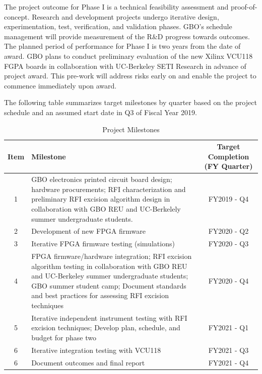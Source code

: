 \documentclass[10pt]{myNSF}
\begin{document}
The project outcome for Phase {\sc I} is a technical feasibility
assessment and proof-of-concept. Research and development projects
undergo iterative design, experimentation, test, verification, and
validation phases. GBO's schedule management will provide measurement
of the R\&D progress towards outcomes. The planned period of
performance for Phase {\sc I} is two years from the date of award. GBO
plans to conduct preliminary evaluation of the new Xilinx VCU118 FGPA
boards in collaboration with UC-Berkeley SETI Research in advance of
project award. This pre-work will address risks early on and enable
the project to commence immediately upon award.

The following table summarizes target milestones by quarter based on
the project schedule and an assumed start date in Q3 of Fiscal Year
2019.

\begin{table}[t]
  \centering
  \caption{Project Milestones \label{table:milestones}}
  \begin{tabular}{|c|p{3.75in}|c|}
    \hline
    Item & Milestone & Target Completion (FY Quarter) \\
    \hline
    1 & GBO electronics printed circuit board design; hardware procurements; RFI characterization and preliminary RFI excision algorithm design in collaboration with GBO REU and UC-Berkelely summer undergraduate students. & FY2019 - Q4 \\
    \hline
    2 & Development of new FPGA firmware & FY2020 - Q2 \\
    \hline
    3 & Iterative FPGA firmware testing (simulations) & FY2020 - Q3 \\
    \hline
    4 & FPGA firmware/hardware integration; RFI excision algorithm testing in collaboration with GBO REU and UC-Berkeley summer undergraduate students; GBO summer student camp; Document standards and best practices for assessing RFI excision techniques & FY2020 - Q4 \\
    \hline
    5 & Iterative independent instrument testing with RFI excision techniques; Develop plan, schedule, and budget for phase two & FY2021 - Q1 \\
    \hline
    6 & Iterative integration testing with VCU118 & FY2021 - Q3 \\
    6 & Document outcomes and final report & FY2021 - Q4 \\
    \hline
  \end{tabular}
\end{table}
\end{document}

